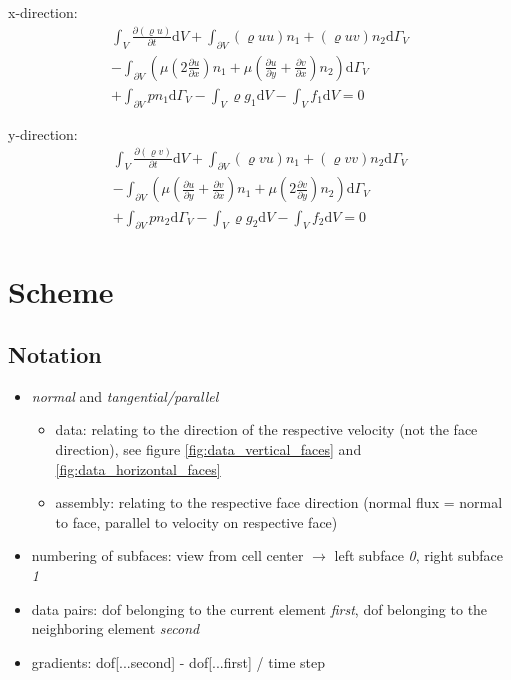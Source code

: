 \documentclass[a4paper,10pt]{scrartcl}
\begin{document}
x-direction:
\begin{equation}
\begin{split}
  \int_{V} \frac{\partial (\varrho u)}{\partial t} \text{d} V + \int_{\partial V} (\varrho u u)n_1 + (\varrho u v)n_2 \text{d} \Gamma_{V} \\[1em]
    - \int_{\partial V} \left(\mu (2\frac{\partial u}{\partial x})n_1 + \mu (\frac{\partial u}{\partial y} + \frac{\partial v}{\partial x})n_2 \right) \text{d} \Gamma_{V} \\[1em]
    + \int_{\partial V} p n_1 \text{d} \Gamma_{V} - \int_{V} \varrho g_1 \text{d} V - \int_{V} f_1 \text{d} V = 0
\end{split}
\end{equation}

y-direction:
\begin{equation}
\begin{split}
  \int_{V} \frac{\partial (\varrho v)}{\partial t} \text{d} V + \int_{\partial V} (\varrho v u)n_1 + (\varrho v v)n_2 \text{d} \Gamma_{V} \\[1em]
    - \int_{\partial V} \left(\mu (\frac{\partial u}{\partial y} + \frac{\partial v}{\partial x})n_1 + \mu (2\frac{\partial v}{\partial y})n_2\right) \text{d} \Gamma_{V} \\[1em]
    + \int_{\partial V} p n_2 \text{d} \Gamma_{V} - \int_{V} \varrho g_2 \text{d} V - \int_{V} f_2 \text{d} V = 0
\end{split}
\end{equation}

\section{Scheme}
\subsection{Notation}
\begin{itemize}
 \item \textit{normal} and \textit{tangential/parallel}
 \begin{itemize}
  \item data: relating to the direction of the respective velocity (not the face direction), see figure \ref{fig:data_vertical_faces} and \ref{fig:data_horizontal_faces}
  \item assembly: relating to the respective face direction (normal flux = normal to face, parallel to velocity on respective face)
 \end{itemize}
 \item numbering of subfaces: view from cell center $\rightarrow$ left subface \textit{0}, right subface \textit{1}
 \item data pairs: dof belonging to the current element \textit{first}, dof belonging to the neighboring element \textit{second}
 \item gradients: dof[...second] - dof[...first] / time step
\end{itemize}
\end{document}
